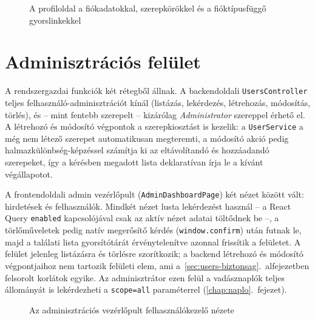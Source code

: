 \begin{figure}[htbp]
	\centering
	\caption{A profiloldal a fiókadatokkal, szerepkörökkel és a fióktípusfüggő gyorslinkekkel}
	\label{fig:profile-screen}
\end{figure}

\section{Adminisztrációs felület}
\label{sec:users-admin}

A rendszergazdai funkciók két rétegből állnak. A backendoldali \texttt{UsersController} teljes
felhasználó-adminisztrációt kínál (listázás, lekérdezés, létrehozás, módosítás, törlés), és --
mint fentebb szerepelt -- kizárólag \emph{Administrator} szereppel érhető el. A létrehozó és
módosító végpontok a szerepkiosztást is kezelik: a \texttt{UserService} a még nem létező szerepet
automatikusan megteremti, a módosító akció pedig halmazkülönbség-képzéssel számítja ki az
eltávolítandó és hozzáadandó szerepeket, így a kérésben megadott lista deklaratívan írja le a
kívánt végállapotot.

A frontendoldali admin vezérlőpult (\texttt{AdminDashboardPage}) két nézet között vált:
hirdetések és felhasználók. Mindkét nézet lusta lekérdezést használ -- a React Query
\texttt{enabled} kapcsolójával csak az aktív nézet adatai töltődnek be --, a törlőműveletek pedig
natív megerősítő kérdés (\texttt{window.confirm}) után futnak le, majd a találati lista
gyorsítótárát érvénytelenítve azonnal frissítik a felületet. A felület jelenleg listázásra és
törlésre szorítkozik; a backend létrehozó és módosító végpontjaihoz nem tartozik felületi elem,
ami a~\ref{sec:users-biztonsag}.~alfejezetben felsorolt korlátok egyike. Az adminisztrátor ezen
felül a vadásznaplók teljes állományát is lekérdezheti a \texttt{scope=all} paraméterrel
(\ref{chap:naplo}.~fejezet).

\begin{figure}[htbp]
	\centering
	\caption{Az adminisztrációs vezérlőpult felhasználókezelő nézete}
	\label{fig:admin-screen}
\end{figure}

